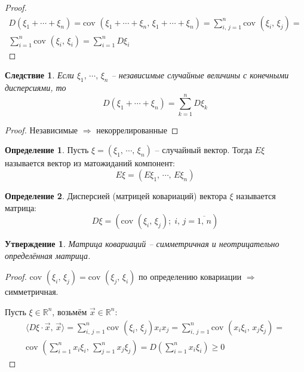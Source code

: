 \documentclass[a4paper,12pt]{article}
\renewcommand{\geq}{\ensuremath{\geqslant}}
\theoremstyle{plain}
\newtheorem{proposition}{Утверждение}[section]
\newtheorem*{corollary}{Следствие}
\theoremstyle{definition}
\newtheorem{definition}{Определение}[section]
\theoremstyle{remark}
\begin{document}
\begin{proof}
	\begin{align*}
		D(\xi_1 + \cdots + \xi_n) = \text{cov }(\xi_1 + \cdots + \xi_n,\, \xi_1 + \cdots + \xi_n) = \sum_{i,\, j = 1}^n\text{cov }(\xi_i,\,\xi_j) = \\
		\sum_{i = 1}^n \text{cov }(\xi_i,\, \xi_i) = \sum_{i = 1}^n D\xi_i
	\end{align*}
\end{proof}

\begin{corollary}
	Если $\xi_1,\,\cdots,\,\xi_n$ -- независимые случайные величины с конечными дисперсиями, то
	\[D(\xi_1 + \cdots + \xi_n) = \sum_{k = 1}^nD\xi_k\]
\end{corollary}

\begin{proof}
	Независимые $\Rightarrow$ некоррелированные
\end{proof}

\begin{definition}
	Пусть $\xi = (\xi_1,\,\cdots,\,\xi_n)$ -- случайный вектор. Тогда $E\xi$ называется вектор из матожиданий компонент:
	\[E\xi = (E\xi_1,\,\cdots,\,E\xi_n)\]
\end{definition}

\begin{definition}
	Дисперсией (матрицей ковариаций) вектора $\xi$ называется матрица:
	\[D\xi = (\text{cov }(\xi_i,\, \xi_j);\; i,\,j = \overline{1,\,n})\]
\end{definition}

\begin{proposition}
	Матрица ковариаций -- симметричная и неотрицательно определённая матрица.
\end{proposition}

\begin{proof}
	$\text{cov }(\xi_i,\,\xi_j) = \text{cov }(\xi_j,\, \xi_i)$ по определению ковариации $\Rightarrow$ симметричная.

	Пусть $\xi \in \mathbb{R}^n$, возьмём $\vec{x} \in \mathbb{R}^n$:
	\begin{align*}
		\langle D\xi \cdot \vec{x},\, \vec{x}\rangle = \sum_{i,\,j = 1}^n\text{cov }(\xi_i,\,\xi_j)x_ix_j = \sum_{i,\, j = 1}^n \text{cov }(x_i\xi_i,\, x_j\xi_j) = \\
		\text{cov }\left(\sum_{i = 1}^n x_i\xi_i,\, \sum_{j = 1}^n x_j\xi_j\right) = D\left(\sum_{i = 1}^n x_i\xi_i\right) \geq 0
	\end{align*}
\end{proof}
\end{document}
